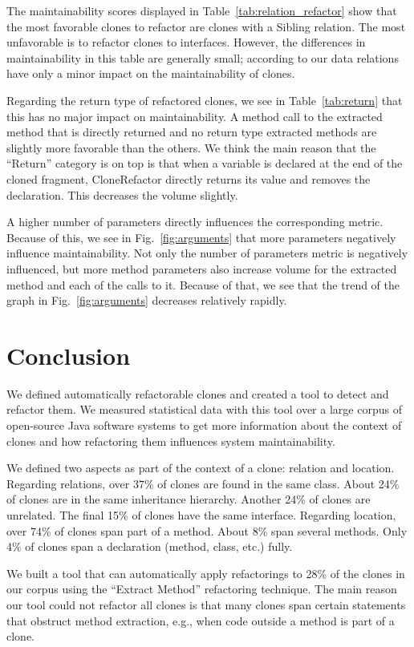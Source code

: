 \documentclass[]{IEEEtran}
\begin{document}
The maintainability scores displayed in Table~\ref{tab:relation_refactor} show that the most favorable clones to refactor are clones with a Sibling relation. The most unfavorable is to refactor clones to interfaces. However, the differences in maintainability in this table are generally small; according to our data relations have only a minor impact on the maintainability of clones.

Regarding the return type of refactored clones, we see in Table~\ref{tab:return} that this has no major impact on maintainability. A method call to the extracted method that is directly returned and no return type extracted methods are slightly more favorable than the others. We think the main reason that the ``Return'' category is on top is that when a variable is declared at the end of the cloned fragment, CloneRefactor directly returns its value and removes the declaration. This decreases the volume slightly.

A higher number of parameters directly influences the corresponding metric. Because of this, we see in Fig.~\ref{fig:arguments} that more parameters negatively influence maintainability. Not only the number of parameters metric is negatively influenced, but more method parameters also increase volume for the extracted method and each of the calls to it. Because of that, we see that the trend of the graph in Fig.~\ref{fig:arguments} decreases relatively rapidly.

\section{Conclusion}
We defined automatically refactorable clones and created a tool to detect and refactor them. We measured statistical data with this tool over a large corpus of open-source Java software systems to get more information about the context of clones and how refactoring them influences system maintainability.

We defined two aspects as part of the context of a clone: relation and location. Regarding relations, over 37\% of clones are found in the same class. About 24\% of clones are in the same inheritance hierarchy. Another 24\% of clones are unrelated. The final 15\% of clones have the same interface. Regarding location, over 74\% of clones span part of a method. About 8\% span several methods. Only 4\% of clones span a declaration (method, class, etc.) fully.

We built a tool that can automatically apply refactorings to 28\% of the clones in our corpus using the ``Extract Method'' refactoring technique. The main reason our tool could not refactor all clones is that many clones span certain statements that obstruct method extraction, e.g., when code outside a method is part of a clone.
\end{document}
